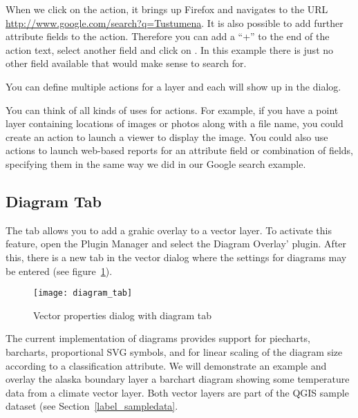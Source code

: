 When we click on the action, it brings up Firefox and navigates to the URL
\url{http://www.google.com/search?q=Tustumena}. It is also possible to add further 
attribute fields to the action. Therefore you can add a ``+'' to the end of the action 
text, select another field and click on . In this example there 
is just no other field available that would make sense to search for.

You can define multiple actions for a layer and each will show up in the
 dialog. 

You can think of all kinds of uses for actions. For example, if you have a point layer
containing locations of images or photos along with a file name, you could
create an action to launch a viewer to display the image. You could also use
actions to launch web-based reports for an attribute field or combination of
fields, specifying them in the same way we did in our Google search example.

\subsection{Diagram Tab}\label{sec:diagram}

The  tab allows you to add a grahic overlay to a vector layer.
To activate this feature, open the Plugin Manager and select the Diagram Overlay' 
plugin. After this, there is a new tab in the vector  dialog where the settings for diagrams may be entered (see
figure~\ref{fig:diagramtab}).

\begin{figure}[ht]
   \begin{center}
   \caption{Vector properties dialog with diagram tab \nixcaption}\label{fig:diagramtab}\smallskip
   \texttt{[image: diagram\_tab]}
\end{center}
\end{figure}

The current implementation of diagrams provides support for piecharts, barcharts, 
proportional SVG symbols, and for linear scaling of the diagram size according 
to a classification attribute. We will demonstrate an example and overlay the 
alaska boundary layer a barchart diagram showing some temperature data from 
a climate vector layer. Both vector layers are part of the QGIS sample dataset (see
Section~\ref{label_sampledata}.

